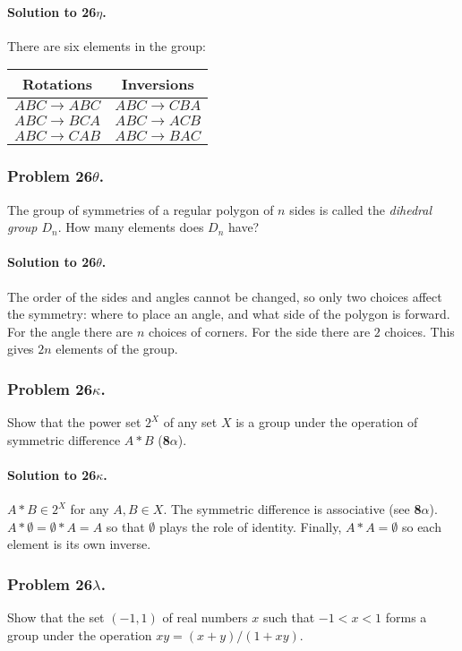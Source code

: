 \paragraph*{Solution to 26$\eta$.}
There are six elements in the group:
\begin{center}
\begin{tabular}{c|c}
Rotations & Inversions \\
\hline
$ABC \rightarrow ABC$ & $ABC \rightarrow CBA $ \\
$ABC \rightarrow BCA$ & $ABC \rightarrow ACB $ \\
$ABC \rightarrow CAB$ & $ABC \rightarrow BAC $
\end{tabular}
\end{center}

\subsubsection{Problem 26$\theta$.}
The group of symmetries of a regular polygon of $n$ sides is called the
\textit{dihedral group $D_n$}. How many elements does $D_n$ have?

\paragraph*{Solution to 26$\theta$.}
The order of the sides and angles cannot be changed, so only two choices
affect the symmetry: where to place an angle, and what side of the polygon
is forward. For the angle there are $n$ choices of corners. For the side
there are $2$ choices. This gives $2n$ elements of the group.

\subsubsection{Problem 26$\kappa$.}
Show that the power set $2^X$ of any set $X$ is a group under the operation
of symmetric difference $A * B$ (\textbf{8$\alpha$}).

\paragraph*{Solution to 26$\kappa$.}
$A * B \in 2^X $ for any $A, B \in X$. The symmetric difference is associative
(see \textbf{8$\alpha$}). $A*\emptyset = \emptyset*A = A$ so that $\emptyset$
plays the role of identity. Finally, $ A*A = \emptyset $ so each element is its
own inverse.

\subsubsection{Problem 26$\lambda$.}
Show that the set $(-1, 1)$ of real numbers $x$ such that $ -1 < x < 1$ forms
a group under the operation $x y = (x +y) / (1 + xy)$.

